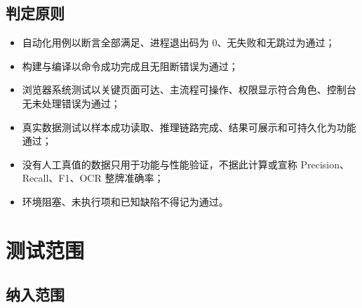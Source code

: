 \subsection{判定原则}\label{test-ux5224ux5b9aux539fux5219}

\begin{itemize}
\tightlist
\item
  自动化用例以断言全部满足、进程退出码为 0、无失败和无跳过为通过；
\item
  构建与编译以命令成功完成且无阻断错误为通过；
\item
  浏览器系统测试以关键页面可达、主流程可操作、权限显示符合角色、控制台无未处理错误为通过；
\item
  真实数据测试以样本成功读取、推理链路完成、结果可展示和可持久化为功能通过；
\item
  没有人工真值的数据只用于功能与性能验证，不据此计算或宣称 Precision、Recall、F1、OCR 整牌准确率；
\item
  环境阻塞、未执行项和已知缺陷不得记为通过。
\end{itemize}

\section{测试范围}\label{test-ux6d4bux8bd5ux8303ux56f4}

\subsection{纳入范围}\label{test-ux7eb3ux5165ux8303ux56f4}

